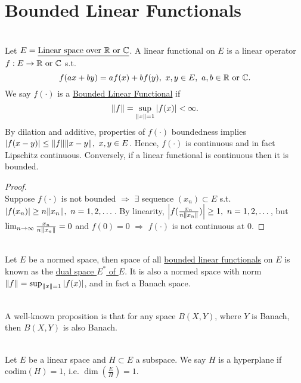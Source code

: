 \section{Bounded Linear Functionals}
\begin{definition}\ \\
Let $E = \underline{\text{Linear space over } \mathbb{R} \text{ or } \mathbb{C}}$. A linear functional on $E$ is a linear operator $f: E \to \mathbb{R} \text{ or } \mathbb{C}$ s.t. 
$$f(ax + by) = af(x) + bf(y),\ x,y \in E,\ a,b \in \mathbb{R}\text{ or }\mathbb{C}.$$ 
We say $f(\cdot)$ is a \underline{Bounded Linear Functional} if 
$$\norm{f} = \sup_{\norm{x} = 1} \abs{f(x)} < \infty.$$ 
By dilation and additive, properties of $f(\cdot)$ boundedness implies $\abs{f(x - y)} \leq \norm{f} \norm{x - y},\ x,y \in E$. Hence, $f(\cdot)$ is continuous and in fact Lipschitz continuous. Conversely, if a linear functional is continuous then it is bounded. 
\end{definition}
\begin{proof}\ \\
Suppose $f(\cdot)$ is not bounded $\Rightarrow$ $\exists$ sequence $(x_n) \subset E$ s.t. $\abs{f(x_n)} \geq n \norm{x_n},\ n=1,2,\dots$. By linearity, $\abs{f(\frac{x_n}{n \norm{x_n}})} \geq 1,\ n=1,2,\dots$, but $\lim_{n \to \infty} \frac{x_n}{n\norm{x_n}} = 0$ and $f(0) = 0$ $\Rightarrow$ $f(\cdot)$ is not continuous at $0$.
\end{proof}

\vspace{3pt}
\begin{definition}\ \\
    Let $E$ be a normed space, then space of all \underline{bounded linear functionals} on $E$ is known as the \underline{dual space $E^*$ of $E$}. It is also a normed space with norm $\norm{f} = \sup_{\norm{x} = 1} \abs{f(x)}$, and in fact a Banach space.
\end{definition}
\begin{remark}\ \\
A well-known proposition is that for any space $B(X,Y)$, where $Y$ is Banach, then $B(X,Y)$ is also Banach.
\end{remark}

\vspace{3pt}
\begin{definition}\ \\
    Let $E$ be a linear space and $H \subset E$ a subspace. We say $H$ is a hyperplane if $\text{codim}(H) = 1$, i.e. $\dim(\frac{E}{H}) = 1$. 
\end{definition}

